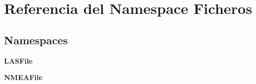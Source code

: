 \section{Referencia del Namespace Ficheros}
\label{namespaceFicheros}
\subsection*{Namespaces}
\begin{DoxyCompactItemize}
\item 
{\bf L\-A\-S\-File}
\item 
{\bf N\-M\-E\-A\-File}
\end{DoxyCompactItemize}
